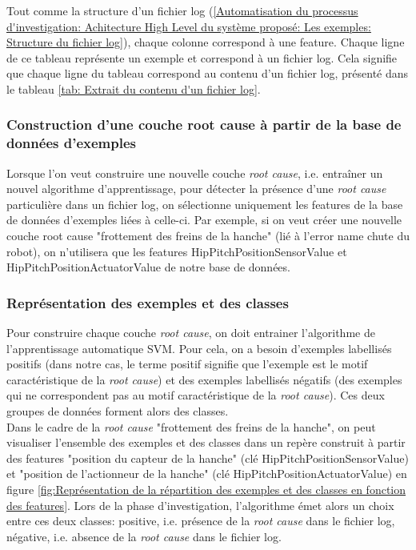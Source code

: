 Tout comme la structure d'un fichier log (\ref{Automatisation du processus d'investigation: Achitecture High Level du système proposé: Les exemples: Structure du fichier log}), chaque colonne correspond à une feature. Chaque ligne de ce tableau représente un exemple et correspond à un fichier log. Cela signifie que chaque ligne du tableau correspond au contenu d'un fichier log, présenté dans le tableau \ref {tab: Extrait du contenu d'un fichier log}.

\subsubsection{Construction d'une couche root cause à partir de la base de données d'exemples}
\label{Automatisation du processus d'investigation: Achitecture High Level du système proposé: Les exemples: Construction d'une couche root cause à partir de la base de données d'exemples}
Lorsque l'on veut construire une nouvelle couche \emph{root cause}, i.e. entraîner un nouvel algorithme d'apprentissage, pour détecter la présence d'une \emph{root cause} particulière dans un fichier log, on sélectionne uniquement les features de la base de données d'exemples liées à celle-ci. Par exemple, si on veut créer une nouvelle couche root cause "frottement des freins de la hanche" (lié à l'error name chute du robot), on n'utilisera que les features HipPitchPositionSensorValue et HipPitchPositionActuatorValue de notre base de données.

\subsubsection{Représentation des exemples et des classes}
\label{Automatisation du processus d'investigation: Achitecture High Level du système proposé: Les exemples: Représentation des exemples et des classes}
Pour construire chaque couche \emph{root cause}, on doit entrainer l'algorithme de l'apprentissage automatique SVM. Pour cela, on a besoin d'exemples labellisés positifs (dans notre cas, le terme positif signifie que l'exemple est le motif caractéristique de la \emph{root cause}) et des exemples labellisés négatifs (des exemples qui ne correspondent pas au motif caractéristique de la \emph{root cause}). Ces deux groupes de données forment alors des classes. \\
Dans le cadre de la \emph{root cause} "frottement des freins de la hanche", on peut visualiser l'ensemble des exemples et des classes dans un repère construit à partir des features "position du capteur de la hanche" (clé HipPitchPositionSensorValue) et "position de l'actionneur de la hanche" (clé HipPitchPositionActuatorValue) en figure \ref{fig:Représentation de la répartition des exemples et des classes en fonction des features}. Lors de la phase d'investigation, l'algorithme émet alors un choix entre ces deux classes: positive, i.e. présence de la \emph{root cause} dans le fichier log, négative, i.e. absence de la \emph{root cause} dans le fichier log.

